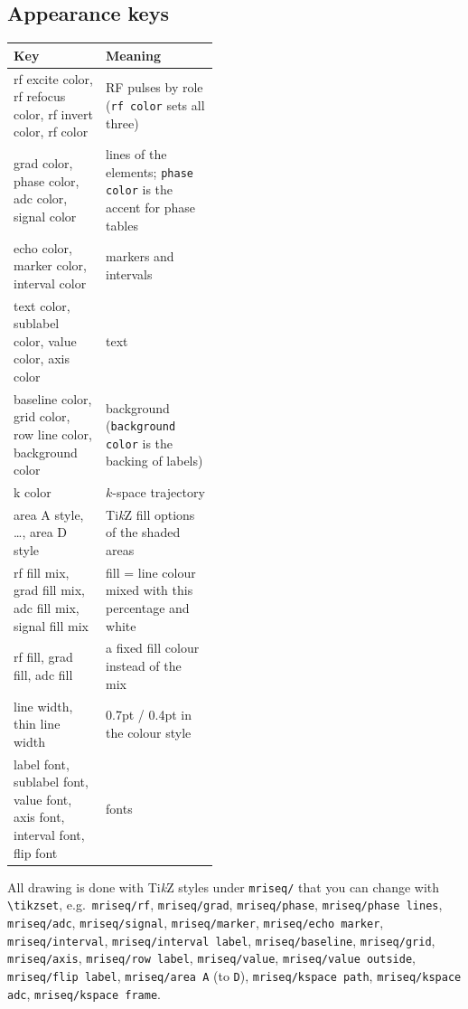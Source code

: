 \documentclass[11pt]{article}
\newcommand\key[1]{\texttt{#1}}
\begin{document}
\subsection{Appearance keys}
\begin{center}\small
\begin{tabularx}{\linewidth}{@{}>{\ttfamily\raggedright\arraybackslash}p{0.45\linewidth}X@{}}
\toprule
\normalfont Key & Meaning \\
\midrule
rf excite color, rf refocus color, rf invert color, rf color & RF pulses by role (\key{rf color} sets all three) \\
grad color, phase color, adc color, signal color & lines of the elements; \key{phase color} is the accent for phase tables \\
echo color, marker color, interval color & markers and intervals \\
text color, sublabel color, value color, axis color & text \\
baseline color, grid color, row line color, background color & background (\key{background color} is the backing of labels) \\
k color & $k$-space trajectory \\
area A style, \dots, area D style & Ti\emph{k}Z fill options of the shaded areas \\
rf fill mix, grad fill mix, adc fill mix, signal fill mix & fill = line colour mixed with this percentage and white \\
rf fill, grad fill, adc fill & a fixed fill colour instead of the mix \\
line width, thin line width & 0.7pt / 0.4pt in the colour style \\
label font, sublabel font, value font, axis font, interval font, flip font & fonts \\
\bottomrule
\end{tabularx}
\end{center}

All drawing is done with Ti\emph{k}Z styles under \texttt{mriseq/} that you can
change with \verb|\tikzset|, e.g.\ \texttt{mriseq/rf}, \texttt{mriseq/grad},
\texttt{mriseq/phase}, \texttt{mriseq/phase lines}, \texttt{mriseq/adc},
\texttt{mriseq/signal}, \texttt{mriseq/marker}, \texttt{mriseq/echo marker},
\texttt{mriseq/interval}, \texttt{mriseq/interval label},
\texttt{mriseq/baseline}, \texttt{mriseq/grid}, \texttt{mriseq/axis},
\texttt{mriseq/row label}, \texttt{mriseq/value}, \texttt{mriseq/value outside},
\texttt{mriseq/flip label}, \texttt{mriseq/area A} (to \texttt{D}),
\texttt{mriseq/kspace path}, \texttt{mriseq/kspace adc}, \texttt{mriseq/kspace frame}.
\end{document}
